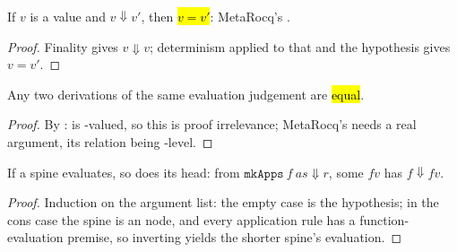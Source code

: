 \begin{corollary}
\label{cor:eval_value}
\leanok
{}
 If $v$ is a value and $v \Downarrow v'$, then \hl{$v = v'$}: MetaRocq's .
\end{corollary}
\begin{proof}
\leanok
{}
 Finality gives $v \Downarrow v$; determinism applied to that and the hypothesis gives $v = v'$.
\end{proof}

\begin{lemma}
\label{lem:eval_unique}
\leanok
{}
 Any two derivations of the same evaluation judgement are \hl{equal}.
\end{lemma}
\begin{proof}
\leanok
{}
 By : \WcbvEval{} is -valued, so this is proof irrelevance; MetaRocq's  needs a real argument, its relation being -level.
\end{proof}

\begin{lemma}
\label{lem:WcbvEval-head_value_of_mkApps}
\leanok
{}
 If a spine evaluates, so does its head: from $\mathtt{mkApps}\ f\ as \Downarrow r$, some $fv$ has $f \Downarrow fv$.
\end{lemma}
\begin{proof}
\leanok
{}
 Induction on the argument list: the empty case is the hypothesis; in the cons case the spine is an  node, and every application rule has a function-evaluation premise, so inverting yields the shorter spine's evaluation.
\end{proof}


